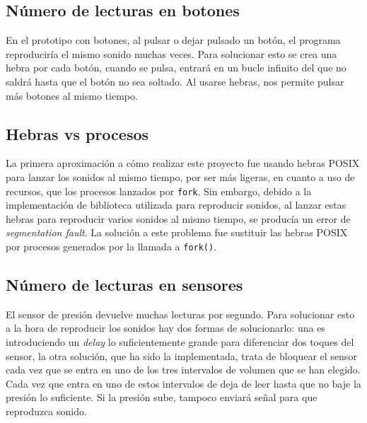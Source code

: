         \subsection{Número de lecturas en botones} %
        \label{sub:NumeroDeLecturasEnBotones}

            En el prototipo con botones, al pulsar o dejar pulsado un botón, el programa reproduciría el mismo
            sonido muchas veces. Para solucionar esto se crea una hebra por cada botón, cuando se pulsa, entrará
            en un bucle infinito del que no saldrá hasta que el botón no sea soltado. Al usarse hebras, nos
            permite pulsar más botones al mismo tiempo.


        \subsection{Hebras vs procesos} %
        \label{sub:HebrasVSProcesos}

            La primera aproximación a cómo realizar este proyecto fue usando hebras POSIX para lanzar los sonidos al
            mismo tiempo, por ser más ligeras, en cuanto a uso de recursos, que los procesos lanzados por \texttt{fork}.
            Sin embargo, debido a la implementación de biblioteca utilizada para reproducir sonidos, al lanzar estas
            hebras para reproducir varios sonidos al mismo tiempo, se producía un error de \textit{segmentation fault}.
            La solución a este problema fue sustituir las hebras POSIX por procesos generados por la llamada a
            \texttt{fork()}.


        \subsection{Número de lecturas en sensores} %
        \label{sub:NumeroDeLecturasEnSensores}

            El sensor de presión devuelve muchas lecturas por segundo. Para solucionar esto a la hora de reproducir los
            sonidos hay dos formas de solucionarlo: una es introduciendo un \textit{delay} lo suficientemente grande
            para diferenciar dos toques del sensor, la otra solución, que ha sido la implementada, trata de bloquear el
            sensor cada vez que se entra en uno de los tres intervalos de volumen que se han elegido. Cada vez que entra
            en uno de estos intervalos de deja de leer hasta que no baje la presión lo suficiente. Si la presión sube,
            tampoco enviará señal para que reproduzca sonido.

